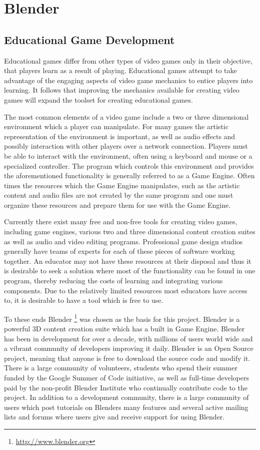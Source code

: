 \chapter{Blender}

\section{Educational Game Development}
Educational games differ from other types of video games only in their
objective, that players learn as a result of playing. Educational games attempt
to take advantage of the engaging aspects of video game mechanics to entice
players into learning. It follows that improving the mechanics available for
creating video games will expand the toolset for creating educational games.


The most common elements of a video game include a two or three dimensional
environment which a player can manipulate. For many games the artistic
representation of the environment is important, as well as audio effects and
possibly interaction with other players over a network connection. Players must
be able to interact with the environment, often using a keyboard and mouse or a
specialized controller. The program which controls this environment and
provides the aforementioned functionality is generally referred to as a Game
Engine. Often times the resources which the Game Engine manipulates, such as
the artistic content and audio files are not created by the same program and
one must organize these resources and prepare them for use with the Game
Engine.


Currently there exist many free and non-free tools for creating video games,
including game engines, various two and three dimensional content creation
suites as well as audio and video editing programs. Professional game design
studios generally have teams of experts for each of these pieces of software
working together. An educator may not have these resources at their disposal and
thus it is desirable to seek a solution where most of the functionality can be
found in one program, thereby reducing the costs of learning and integrating
various components. Due to the relatively limited resources most educators have
access to, it is desirable to have a tool which is free to use. 


To these ends Blender \footnote{\url{http://www.blender.org}} was chosen as the basis for this project.
Blender is a powerful 3D content creation suite which has a built in Game
Engine. Blender has been in development for over a decade, with millions of
users world wide and a vibrant community of developers improving it daily.
Blender is an Open Source project, meaning that anyone is free to download the
source code and modify it. There is a large community of volunteers, students
who spend their summer funded by the Google Summer of Code initiative, as well
as full-time developers paid by the non-profit Blender Institute who
continually contribute code to the project. In addition to a development
community, there is a large community of users which post tutorials on Blenders
many features and several active mailing lists and forums where users give and
receive support for using Blender.



